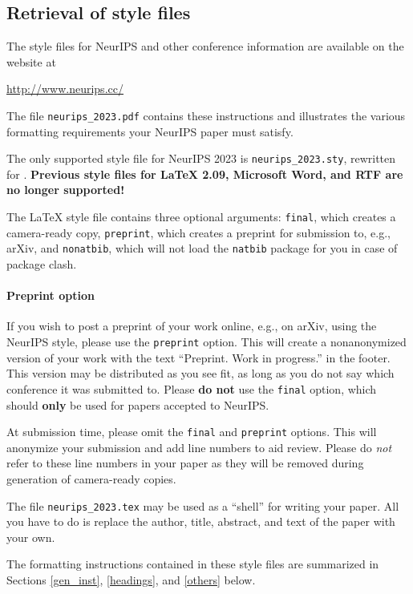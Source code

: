 \documentclass{article}
\begin{document}
\subsection{Retrieval of style files}


The style files for NeurIPS and other conference information are available on
the website at
\begin{center}
  \url{http://www.neurips.cc/}
\end{center}
The file \verb+neurips_2023.pdf+ contains these instructions and illustrates the
various formatting requirements your NeurIPS paper must satisfy.


The only supported style file for NeurIPS 2023 is \verb+neurips_2023.sty+,
rewritten for \LaTeXe{}.  \textbf{Previous style files for \LaTeX{} 2.09,
  Microsoft Word, and RTF are no longer supported!}


The \LaTeX{} style file contains three optional arguments: \verb+final+, which
creates a camera-ready copy, \verb+preprint+, which creates a preprint for
submission to, e.g., arXiv, and \verb+nonatbib+, which will not load the
\verb+natbib+ package for you in case of package clash.


\paragraph{Preprint option}
If you wish to post a preprint of your work online, e.g., on arXiv, using the
NeurIPS style, please use the \verb+preprint+ option. This will create a
nonanonymized version of your work with the text ``Preprint. Work in progress.''
in the footer. This version may be distributed as you see fit, as long as you do not say which conference it was submitted to. Please \textbf{do
  not} use the \verb+final+ option, which should \textbf{only} be used for
papers accepted to NeurIPS. 


At submission time, please omit the \verb+final+ and \verb+preprint+
options. This will anonymize your submission and add line numbers to aid
review. Please do \emph{not} refer to these line numbers in your paper as they
will be removed during generation of camera-ready copies.


The file \verb+neurips_2023.tex+ may be used as a ``shell'' for writing your
paper. All you have to do is replace the author, title, abstract, and text of
the paper with your own.


The formatting instructions contained in these style files are summarized in
Sections \ref{gen_inst}, \ref{headings}, and \ref{others} below.
\end{document}
